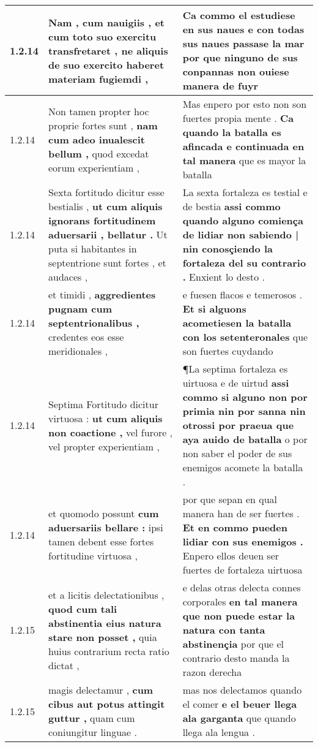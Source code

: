 \begin{tabular}{|p{1cm}|p{6.5cm}|p{6.5cm}|}
1.2.14 & Nam , cum nauigiis , \textbf{ et cum toto suo exercitu transfretaret , } ne aliquis de suo exercito haberet materiam fugiemdi , & Ca commo el estudiese en sus naues \textbf{ e con todas sus naues passase la mar } por que ninguno de sus conpannas non ouiese manera de fuyr \\\hline
1.2.14 & Non tamen propter hoc proprie fortes sunt , \textbf{ nam cum adeo inualescit bellum , } quod excedat eorum experientiam , & Mas enpero por esto non son fuertes propia mente . \textbf{ Ca quando la batalla es afincada e continuada en tal manera } que es mayor la batalla \\\hline
1.2.14 & Sexta fortitudo dicitur esse bestialis , \textbf{ ut cum aliquis ignorans fortitudinem aduersarii , bellatur . } Ut puta si habitantes in septentrione sunt fortes , et audaces , & La sexta fortaleza es testial e de bestia \textbf{ assi commo quando alguno comiença de lidiar non sabiendo | nin conosçiendo la fortaleza del su contrario . } Enxient lo desto . \\\hline
1.2.14 & et timidi , \textbf{ aggredientes pugnam cum septentrionalibus , } credentes eos esse meridionales , & e fuesen flacos e temerosos . \textbf{ Et si alguons acometiesen la batalla con los setenteronales } que son fuertes cuydando \\\hline
1.2.14 & Septima Fortitudo dicitur virtuosa : \textbf{ ut cum aliquis non coactione , } vel furore , vel propter experientiam , & ¶La septima fortaleza es uirtuosa e de uirtud \textbf{ assi commo si alguno non por primia nin por sanna nin otrossi por praeua que aya auido de batalla } o por non saber el poder de sus enemigos acomete la batalla . \\\hline
1.2.14 & et quomodo possunt \textbf{ cum aduersariis bellare : } ipsi tamen debent esse fortes fortitudine virtuosa , & por que sepan en qual manera han de ser fuertes . \textbf{ Et en commo pueden lidiar con sus enemigos . } Enpero ellos deuen ser fuertes de fortaleza uirtuosa \\\hline
1.2.15 & et a licitis delectationibus , \textbf{ quod cum tali abstinentia eius natura stare non posset , } quia huius contrarium recta ratio dictat , & e delas otras delecta connes corporales \textbf{ en tal manera que non puede estar la natura con tanta abstinençia } por que el contrario desto manda la razon derecha \\\hline
1.2.15 & magis delectamur , \textbf{ cum cibus aut potus attingit guttur , } quam cum coniungitur linguae . & mas nos delectamos quando el comer \textbf{ e el beuer llega ala garganta } que quando llega ala lengua . \\\hline

\end{tabular}

